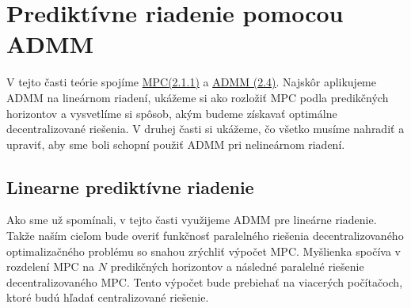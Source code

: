 \section{Prediktívne riadenie pomocou ADMM}
\label{se:MPC_ADMM}
V tejto časti teórie spojíme \hyperref[subse:MPC]{MPC(2.1.1)} a \hyperref[subse:ADMM]{ADMM (2.4)}. Najskôr aplikujeme ADMM na lineárnom riadení, ukážeme si ako rozložiť MPC podla predikčných horizontov a vysvetlíme si spôsob, akým budeme získavať optimálne decentralizované riešenia. V druhej časti si ukážeme, čo všetko musíme nahradiť a upraviť, aby sme boli schopní použiť ADMM pri nelineárnom riadení. 

\subsection{Linearne prediktívne riadenie}
\label{subse:Lin_MPC_ADMM}
Ako sme už spomínali, v tejto časti využijeme ADMM pre lineárne riadenie. Takže naším cieľom bude overiť funkčnosť paralelného riešenia decentralizovaného optimalizačného problému so snahou zrýchliť výpočet MPC. Myšlienka spočíva v rozdelení MPC na $N$ predikčných horizontov a následné paralelné riešenie decentralizovaného MPC. Tento výpočet bude prebiehať na viacerých počítačoch, ktoré budú hľadať centralizované riešenie. 

